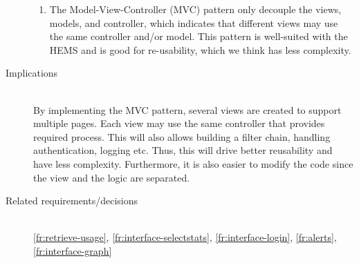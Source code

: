 \begin{description}
\begin{enumerate}
\item The Model-View-Controller (MVC) pattern only decouple the views, models, and controller, which indicates that different views may use the same controller and/or model. This pattern is well-suited with the HEMS and is good for re-usability, which we think has less complexity.

\end{enumerate}

\item [Implications]~\\
By implementing the MVC pattern, several views are created to support multiple pages. Each view may use the same controller that provides required process. This will also allows building a filter chain, handling authentication, logging etc. Thus, this will drive better reusability and have less complexity. Furthermore, it is also easier to modify the code since the view and the logic are separated.

\item [Related requirements/decisions]~\\
\ref{fr:retrieve-usage}, \ref{fr:interface-selectstats}, \ref{fr:interface-login}, \ref{fr:alerts}, \ref{fr:interface-graph} 

\end{description}




